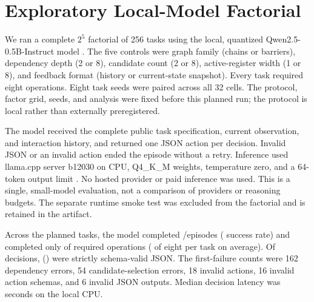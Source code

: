 \documentclass[sigconf,nonacm]{acmart}
\begin{document}
\begin{table}[t]
\centering\small

\caption{Descriptive high-minus-low contrasts in the 16-episode
Copilot-routed fractional factorial. Eight episodes contribute to each
factor level; each of only two task seeds spans four conditions per level.
Main effects may be aliased with three-factor interactions.}
\label{tab:model-factorial}
\end{table}

\section{Exploratory Local-Model Factorial}
We ran a complete $2^5$ factorial of 256 tasks using the local,
quantized Qwen2.5-0.5B-Instruct model \cite{qwen}. The five controls were
graph family (chains or barriers), dependency depth (2 or 8), candidate
count (2 or 8), active-register width (1 or 8), and feedback format (history
or current-state snapshot). Every task required eight operations. Eight
task seeds were paired across all 32 cells. The protocol, factor grid,
seeds, and analysis were fixed before this planned run; the protocol is
local rather than externally preregistered.

The model received the complete public task specification, current
observation, and interaction history, and returned one JSON action per
decision. Invalid JSON or an invalid action ended the episode without a
retry. Inference used llama.cpp server b12030 on CPU, Q4\_K\_M weights,
temperature zero, and a 64-token output limit \cite{llamacpp}. No hosted
provider or paid inference was used. This is a single, small-model
evaluation, not a comparison of providers or reasoning budgets. The
separate runtime smoke test was excluded from the factorial and is retained
in the artifact.

Across the planned tasks, the model completed
\LocalSuccessCount/\LocalEpisodeCount episodes
(\LocalOverallSuccessRate{} success rate) and completed only
\LocalCompletedOperationCount{} of \LocalRequiredOperationCount{} required
operations (\LocalMeanCompleted{} of eight per task on average). Of
\LocalDecisionCount{} decisions,
\LocalSchemaValidCount{} (\LocalSchemaValidRate{}) were strictly
schema-valid JSON. The first-failure counts were 162 dependency errors, 54
candidate-selection errors, 18 invalid actions, 16 invalid action schemas,
and 6 invalid JSON outputs. Median decision latency was
\LocalMedianLatency{} seconds on the local CPU.
\end{document}
